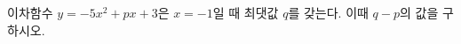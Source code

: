\hspace*{2mm}\begin{minipage}[t]{\dimexpr\linewidth-2mm\relax}\vspace{0pt}
이차함수 $y=-5x^2+px+3$은 $x=-1$일 때 최댓값 $q$를 갖는다. 이때 $q-p$의 값을 구하시오. \end{minipage}
